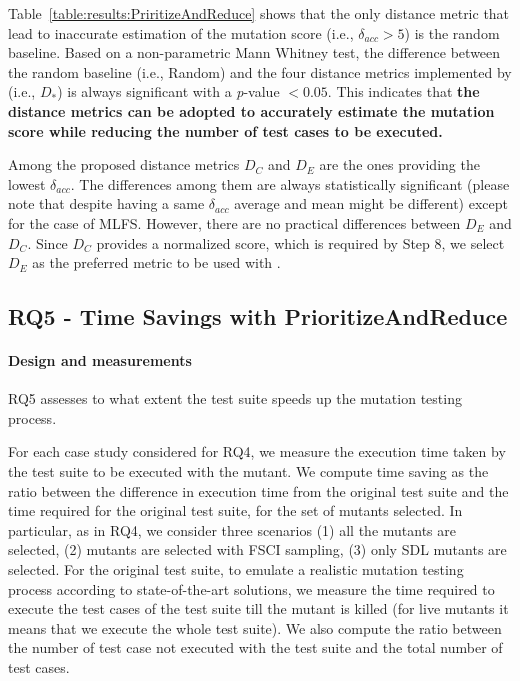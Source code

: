 Table~\ref{table:results:PriritizeAndReduce} shows that the only distance metric that lead to inaccurate estimation of the mutation score (i.e., $\delta_{acc}  > 5$) is the random baseline.
Based on a non-parametric Mann Whitney test, the difference between the random baseline (i.e., Random) and the four distance metrics implemented by \APPR (i.e., $D_*$) is always significant with a \textit{p}-value $< 0.05$. This indicates that \textbf{the \APPR distance metrics can be adopted to accurately estimate the mutation score while reducing the number of test cases to be executed.}

Among the proposed distance metrics $D_C$ and $D_E$ are the ones providing the lowest $\delta_{acc}$. The differences among them are always statistically significant (please note that despite having a same $\delta_{acc}$ average and mean might be different) except for the case of MLFS. 
However, there are no practical differences between $D_E$ and $D_C$. 
Since $D_C$ provides a normalized score, which is required by Step 8, we select $D_E$ as the preferred metric to be used with \APPR.



\subsection{RQ5 - Time Savings with PrioritizeAndReduce}

\paragraph{Design and measurements}

RQ5 assesses to what extent  the \APPR test suite speeds up the mutation testing process.


For each case study considered for RQ4, we measure the execution time taken by the \APPR test suite to be executed with the mutant.
We compute time saving as the ratio between the difference in execution time from the original test suite and the time required for the original test suite, for the set of mutants selected.
In particular, as in RQ4, we consider three scenarios (1) all the mutants are selected, (2) mutants are selected with FSCI sampling, (3) only SDL mutants are selected.
For the original test suite, to emulate a realistic mutation testing process according to state-of-the-art solutions, we measure the time required to execute the test cases of the test suite till the mutant is killed (for live mutants it means that we execute the whole test suite). 
We also compute 
the ratio between the number of test case not executed with the \APPR test suite and the total number of test cases.


